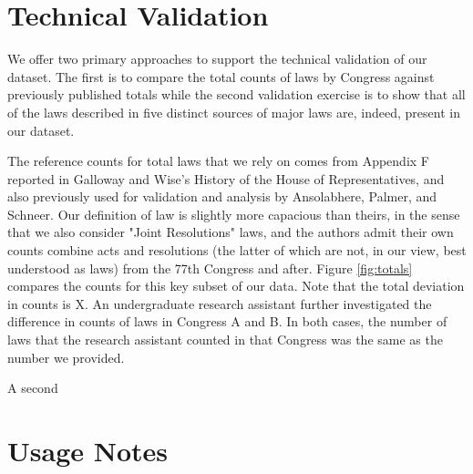\documentclass[fleqn,10pt]{wlscirep}
\begin{document}

\section*{Technical Validation}


We offer two primary approaches to support the technical validation of our dataset. The first is to compare the total counts of laws by Congress against previously published totals while the second validation exercise is to show that all of the laws described in five distinct sources of major laws are, indeed, present in our dataset.

The reference counts for total laws that we rely on comes from Appendix F reported in Galloway and Wise's History of the House of Representatives, and also previously used for validation and analysis by Ansolabhere, Palmer, and Schneer.\cite{ansolabehere_palmer_schneer_2016} Our definition of law is slightly more capacious than theirs, in the sense that we also consider "Joint Resolutions" laws, and the authors admit their own counts combine acts and resolutions (the latter of which are not, in our view, best understood as laws) from the 77th Congress and after. Figure \ref{fig:totals} compares the counts for this key subset of our data. Note that the total deviation in counts is X. An undergraduate research assistant further investigated the difference in counts of laws in Congress A and B. In both cases, the number of laws that the research assistant counted in that Congress was the same as the number we provided. 

A second 
\

\section*{Usage Notes}  \label{sec:usage}
\end{document}
